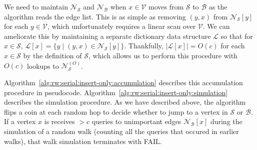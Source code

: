 \documentclass[10]{report}
\begin{document}
We need to maintain $\mathcal{N}_\mathcal{S}$ and $\mathcal{N}_\mathcal{B}$ when $x \in \mathcal{V}$ moves from $\mathcal{S}$ to $\mathcal{B}$ as the algorithm reads the edge list. 
This is as simple as removing $(y, x)$ from $\mathcal{N}_\mathcal{S}[y]$ for each $y \in \mathcal{V}$, which unfortunately requires a linear scan over $\mathcal{V}$.
We can ameliorate this by maintaining a separate dictionary data structure $\mathcal{L}$ so that for $x \in \mathcal{S}$, $\mathcal{L}[x] = \{ y \mid (y, x) \in \mathcal{N}_\mathcal{S}[y] \}$.
Thankfully, $|\mathcal{L}[x]| = O(c)$ for each $x \in \mathcal{S}$ by the definition of $\mathcal{S}$, which allows us to perform this procedure with $O(c)$ lookups to $\mathcal{N}_\mathcal{S}^{(O)}$.

Algorithm~\ref{alg:rw:serial:insert-only:accumulation} describes this accumulation procedure in pseudocode. 
Algorithm~\ref{alg:rw:serial:insert-only:simulation} describes the simulation procedure.
As we have described above, the algorithm flips a coin at each random hop to decide whether to jump to a vertex in $\mathcal{S}$ or $\mathcal{B}$.
If a vertex $x$ is receives $> c$ queries to unimportant edges $\mathcal{N}_\mathcal{B}[x]$ during the simulation of a random walk (counting all the queries that occured in earlier walks), that walk simulation terminates with FAIL.
\end{document}
